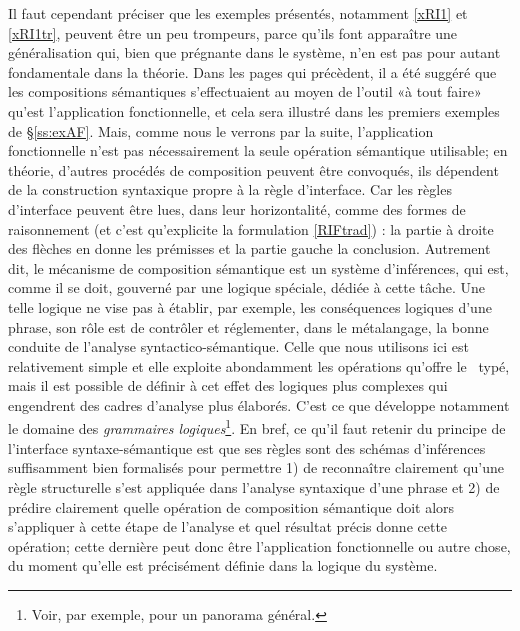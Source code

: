 Il faut cependant préciser que les exemples présentés, notamment \ref{xRI1} et \ref{xRI1tr},  peuvent être un peu trompeurs,  parce qu'ils font apparaître une généralisation qui, bien que prégnante dans le système, n'en est pas pour autant fondamentale dans la théorie.
Dans les pages qui précèdent, il a été suggéré que les compositions sémantiques s'effectuaient au moyen de l'outil «à tout faire» qu'est l'application fonctionnelle, 
et cela sera illustré dans les premiers exemples de \S\ref{ss:exAF}.  
Mais, comme nous le verrons par la suite, l'application fonctionnelle n'est pas nécessairement la seule opération sémantique utilisable; en théorie, d'autres procédés de composition peuvent être convoqués, ils dépendent de la construction syntaxique propre à la règle d'interface. 
Car les règles d'interface peuvent être lues, dans  leur horizontalité, comme des formes de raisonnement (et c'est qu'explicite la formulation \ref{RIFtrad}) : la partie à droite des flèches en donne les prémisses et la partie gauche la conclusion. 
Autrement dit, le mécanisme de composition sémantique est un système d'inférences, qui est, comme il se doit, gouverné par une logique spéciale, dédiée à cette tâche.  Une telle logique %
ne vise pas à établir, par exemple, les conséquences logiques d'une phrase, son rôle est de contrôler et réglementer, dans le métalangage, la bonne conduite de l'analyse syntactico-sémantique. 
Celle que nous utilisons ici est relativement simple et elle exploite abondamment les opérations qu'offre le \lcalcul\ typé, mais il est possible de définir à cet effet des logiques plus complexes qui engendrent des cadres d'analyse plus élaborés.  C'est ce que développe notamment le domaine des \emph{grammaires logiques}\footnote{Voir, par exemple, \citet{Morrill:12} pour un panorama général.}. 
En bref, ce qu'il faut retenir du principe de l'interface syntaxe-sémantique est que ses règles sont des schémas d'inférences suffisamment bien formalisés pour permettre 1) de reconnaître clairement qu'une règle structurelle s'est appliquée dans l'analyse syntaxique d'une phrase et 2) de prédire clairement quelle opération de composition sémantique doit alors s'appliquer à cette étape de l'analyse et quel résultat précis donne cette opération; cette dernière peut donc être l'application fonctionnelle ou autre chose, du moment qu'elle est précisément définie dans la logique du système.



